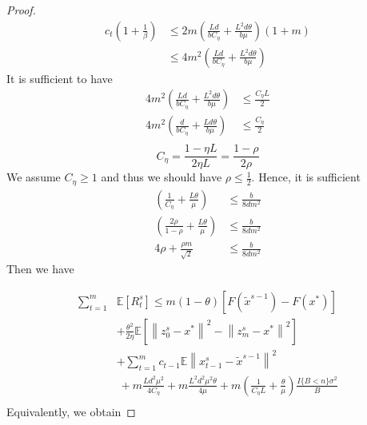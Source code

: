 \documentclass{article}
\newcommand*{\E}{\mathbb{E}}
\newcommand{\norm}[1]{\left\lVert#1\right\rVert}
\theoremstyle{definition}
\theoremstyle{remark}
\begin{document}
{\begin{proof}
\begin{equation}
\begin{split}
c_{t}(1+\frac{1}{\beta})&\leq 2m(\frac{Ld}{bC_{\eta} }+\frac{L^2d\theta}{b\mu })(1+m)\\
&\leq 4m^2(\frac{Ld}{bC_{\eta} }+\frac{L^2d\theta}{b\mu })
\end{split}
\end{equation}
It is sufficient to have
\begin{equation}
\begin{split}
 4m^2(\frac{Ld}{bC_{\eta} }+\frac{L^2d\theta}{b\mu }) &\leq \frac{C_{\eta} L}{2}\\
  4m^2(\frac{d}{bC_{\eta} }+\frac{Ld\theta}{b\mu }) &\leq \frac{C_{\eta}}{2}\\
\end{split}
\end{equation}
{\color{red}
\[
C_{\eta} = \frac{1-\eta L}{2\eta L} = \frac{1-\rho}{2\rho}
\]
We assume $C_{\eta} \geq 1$ and thus we should have $\rho \leq \frac{1}{2}$.
}
Hence, it is sufficient
\begin{equation}
\begin{split}
  (\frac{1}{C_{\eta} }+\frac{L\theta}{\mu }) &\leq \frac{b}{8dm^2}\\
    (\frac{2\rho}{1-\rho}+\frac{L\theta}{\mu }) &\leq \frac{b}{8dm^2}\\
  4\rho+ \frac{\rho m}{\sqrt{2}}&\leq \frac{b}{8dm^2}
\end{split}
\end{equation}
Then we have 

\begin{equation}
\begin{split}
\sum_{t=1}^{m} &\E[R_{t}^s]\leq m(1-\theta)[F(\widetilde{x}^{s-1})-F(x^*)] \\
&+ {\frac{ \theta^2}{2\eta}}\E[\norm{z_{0}^s-x^*}^2-\norm{z_{m}^s-x^*}^2]\\
&+ \sum_{t=1}^{m} c_{t-1}\E\norm{x_{t-1}^s-\widetilde{x}^{s-1}}^2\\
&~+m\frac{Ld^2\mu^2}{4C_{\eta}}+m\frac{ L^2d^2\mu^2\theta}{4\mu}+m(\frac{1}{C_{\eta} L}+\frac{\theta}{\mu})\frac{I\{B < n\} \sigma ^2}{B}\\
\end{split}
\end{equation}
Equivalently, we obtain


\end{proof}}
\end{document}
